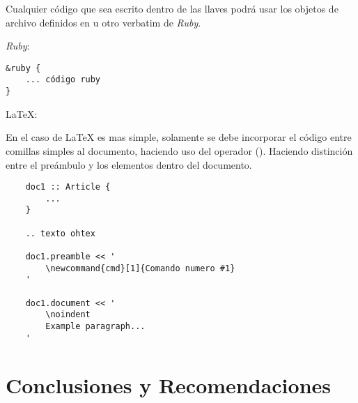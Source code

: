 \documentclass[12pt,letterpaper,titlepage,oneside,openright]{book}
\newcommand{\OhTeX}{%
    \makebox[0.76em][c]{O}%
    \makebox[0.25em][c]{%
        \raisebox{0.14em}[0em][0em]{%
            \fontsize{0.5em}{0cm}%
                \selectfont H%
        }%
    }%
    \makebox[1.35em][c]{\TeX}%
}
\newcommand{\latex}{\LaTeX\xspace}
\newcommand{\ohtex}{\OhTeX\xspace}
\newcommand{\ruby}{\textit{Ruby}\xspace}
\newcommand{\ttcode}[1]{(\texttt{#1})}
\begin{document}
Cualquier código que sea escrito dentro de las llaves podrá usar los objetos de
archivo definidos en \ohtex u otro verbatim de \ruby.

\ruby:

\begin{center}
\begin{lstlisting}
&ruby {
    ... código ruby
}
\end{lstlisting}
\end{center}

\LaTeX:

En el caso de \latex es mas simple, solamente se debe incorporar el código entre
comillas simples al documento, haciendo uso del operador \ttcode{\<\<}. Haciendo
distinción entre el preámbulo y los elementos dentro del documento.

\begin{center}
\begin{lstlisting}
    doc1 :: Article {
        ...
    }

    .. texto ohtex

    doc1.preamble << '
        \newcommand{cmd}[1]{Comando numero #1}
    '

    doc1.document << '
        \noindent
        Example paragraph...
    '
\end{lstlisting}
\end{center}


\chapter{Conclusiones y Recomendaciones}
\lipsum[1-2]
\end{document}
